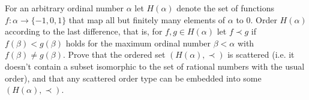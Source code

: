 For an arbitrary ordinal number $\alpha$ let $H(\alpha)$ denote the set of functions $f\colon \alpha \rightarrow \{ -1,0,1\}$ that map all but finitely many elements of $\alpha$ to $0$. Order $H(\alpha)$ according to the last difference, that is, for $f, g\in H(\alpha)$ let $f\prec g$ if $f(\beta) < g(\beta)$ holds for the maximum ordinal number $\beta < \alpha$ with $f(\beta) \neq g(\beta)$. Prove that the ordered set $(H(\alpha), \prec)$ is scattered (i.e. it doesn't contain a subset isomorphic to the set of rational numbers with the usual order), and that any scattered order type can be embedded into some $(H(\alpha), \prec)$.
